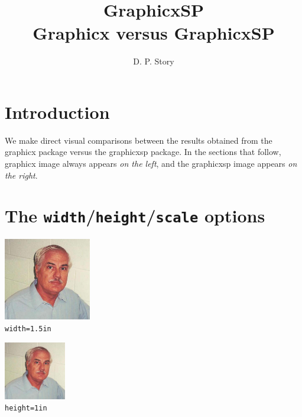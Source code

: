 \documentclass{article}
\title{\texorpdfstring{\textsf{GraphicxSP}\\\textsf{Graphicx} versus \textsf{GraphicxSP}}
    {GraphicxSP: Graphicx versus GraphicxSP}}
\author{D. P. Story}
\begin{document}
\maketitle

\section{Introduction}

We make direct visual comparisons between the results obtained from the
\textsf{graphicx} package versus the \textsf{graphicxsp} package. In the sections
that follow, \textsf{graphicx} image always appears \emph{on the left}, and the
\textsf{graphicxsp} image appears \emph{on the right}.

\section{The \texttt{width}/\texttt{height}/\texttt{scale} options}

\begin{center}
\includegraphics[width=1.5in]{graphics/AdobeDon}
\\[1ex]
\texttt{width=1.5in}
\end{center}

\goodbreak

\begin{center}
\includegraphics[height=1in]{graphics/AdobeDon}
\\[1ex]
        \texttt{height=1in}
\end{center}
\end{document}
